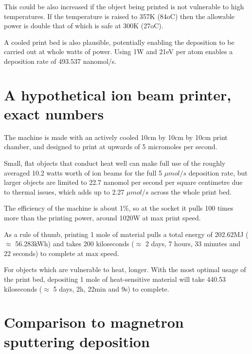 \documentclass[a4paper]{article}
\begin{document}
	\medskip
	
	This could be also increased if the object being printed is not vulnerable to high temperatures. If the temperature is raised to 357K (84oC) then the allowable power is double that of which is safe at 300K (27oC).
	
	\medskip
	
	A cooled print bed is also plausible, potentially enabling the deposition to be carried out at whole watts of power.
	Using 1W and 21eV per atom enables a deposition rate of 493.537 nanomol/s.
	
	\section{A hypothetical ion beam printer, exact numbers}
	
	The machine is made with an actively cooled 10cm by 10cm by 10cm print chamber, and designed to print at upwards of 5 micromoles per second.
	
	\medskip
	
	Small, flat objects that conduct heat well can make full use of the roughly averaged 10.2 watts worth of ion beams for the full 5 $\mu mol/s$ deposition rate, but larger objects are limited to 22.7 nanomol per second per square centimetre due to thermal issues, which adds up to 2.27 $\mu mol/s$ across the whole print bed.
	
	\medskip
	
	The efficiency of the machine is about 1\%, so at the socket it pulls 100 times more than the printing power, around 1020W at max print speed.
	
	\medskip
	
	As a rule of thumb, printing 1 mole of material pulls a total energy of 202.62MJ ($\approx$ 56.283kWh) and takes 200 kiloseconds ($\approx$ 2 days, 7 hours, 33 minutes and 22 seconds) to complete at max speed.
	
	\medskip
	
	For objects which are vulnerable to heat, longer. With the most optimal usage of the print bed, depositing 1 mole of heat-sensitive material will take 440.53 kiloseconds ($\approx$ 5 days, 2h, 22min and 9s) to complete.
	
	\pagebreak
	
	\section{Comparison to magnetron sputtering deposition}
	
\end{document}
